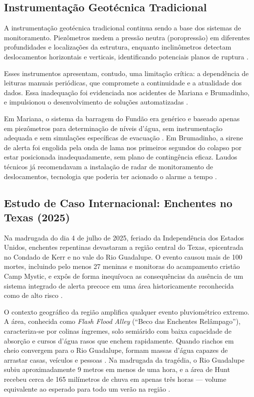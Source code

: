 \subsection{Instrumentação Geotécnica Tradicional}

A instrumentação geotécnica tradicional continua sendo a base dos sistemas de monitoramento. Piezômetros medem a pressão neutra (poropressão) em diferentes profundidades e localizações da estrutura, enquanto inclinômetros detectam deslocamentos horizontais e verticais, identificando potenciais planos de ruptura \cite{geoscan2024sistema, ltec2024piezometros, ltec2025inclinometros}.

Esses instrumentos apresentam, contudo, uma limitação crítica: a dependência de leituras manuais periódicas, que compromete a continuidade e a atualidade dos dados. Essa inadequação foi evidenciada nos acidentes de Mariana e Brumadinho, e impulsionou o desenvolvimento de soluções automatizadas \cite{anm2019relatorio, ibram2020tecnologias}.

Em Mariana, o sistema da barragem do Fundão era genérico e baseado apenas em piezômetros para determinação de níveis d'água, sem instrumentação adequada e sem simulações específicas de evacuação \cite{sequencia2024sismografico, geoscan2024sistema}. Em Brumadinho, a sirene de alerta foi engolida pela onda de lama nos primeiros segundos do colapso por estar posicionada inadequadamente, sem plano de contingência eficaz. Laudos técnicos já recomendavam a instalação de radar de monitoramento de deslocamentos, tecnologia que poderia ter acionado o alarme a tempo \cite{taliberti2025tragedia, metropoles2019laudos}.

\subsection{Estudo de Caso Internacional: Enchentes no Texas (2025)}

Na madrugada do dia 4 de julho de 2025, feriado da Independência dos Estados
Unidos, enchentes repentinas devastaram a região central do Texas, epicentrada
no Condado de Kerr e no vale do Rio Guadalupe. O evento causou mais de 100
mortes, incluindo pelo menos 27 meninas e monitoras do acampamento cristão
Camp Mystic, e expôs de forma inequívoca as consequências da ausência de um
sistema integrado de alerta precoce em uma área historicamente reconhecida
como de alto risco \cite{cnnbrasil2025texas, bbc2025texas, horadopovo2025texas}.

O contexto geográfico da região amplifica qualquer evento pluviométrico
extremo. A área, conhecida como \textit{Flash Flood Alley} (``Beco das Enchentes
Relâmpago''), caracteriza-se por colinas íngremes, solo semiárido com baixa
capacidade de absorção e cursos d'água rasos que enchem rapidamente. Quando
riachos em cheio convergem para o Rio Guadalupe, formam massas d'água
capazes de arrastar casas, veículos e pessoas \cite{bbc2025texas}. Na madrugada
da tragédia, o Rio Guadalupe subiu aproximadamente 9 metros em menos de
uma hora, e a área de Hunt recebeu cerca de 165 milímetros de chuva em apenas
três horas --- volume equivalente ao esperado para todo um verão na região
\cite{cnnbrasil2025texas}.

